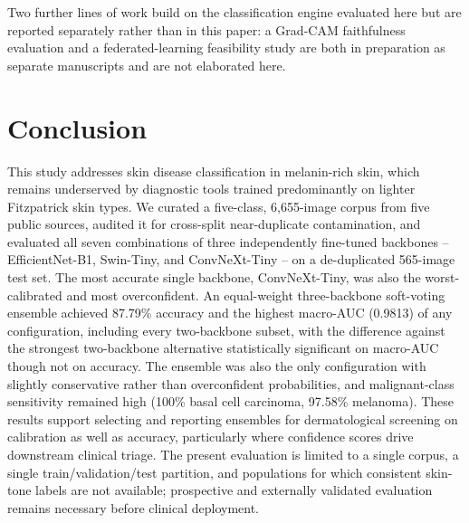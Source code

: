 \documentclass[VANCOUVER,twocolumn]{USG}
\begin{document}
Two further lines of work build on the classification engine evaluated
here but are reported separately rather than in this paper: a Grad-CAM
faithfulness evaluation and a federated-learning feasibility study are
both in preparation as separate manuscripts and are not elaborated here.

\section{Conclusion}\label{sec:conclusion}

This study addresses skin disease classification in melanin-rich skin,
which remains underserved by diagnostic tools trained predominantly on
lighter Fitzpatrick skin types. We curated a five-class, 6,655-image
corpus from five public sources, audited it for cross-split near-duplicate
contamination, and evaluated all seven combinations of three independently
fine-tuned backbones -- EfficientNet-B1, Swin-Tiny, and ConvNeXt-Tiny -- on
a de-duplicated 565-image test set. The most accurate single backbone,
ConvNeXt-Tiny, was also the worst-calibrated and most overconfident. An
equal-weight three-backbone soft-voting ensemble achieved 87.79\% accuracy
and the highest macro-AUC (0.9813) of any configuration, including every
two-backbone subset, with the difference against the strongest
two-backbone alternative statistically significant on macro-AUC though not
on accuracy. The ensemble was also the only configuration with slightly
conservative rather than overconfident probabilities, and malignant-class
sensitivity remained high (100\% basal cell carcinoma, 97.58\% melanoma).
These results support selecting and reporting ensembles for dermatological
screening on calibration as well as accuracy, particularly where
confidence scores drive downstream clinical triage. The present evaluation
is limited to a single corpus, a single train/validation/test partition,
and populations for which consistent skin-tone labels are not available;
prospective and externally validated evaluation remains necessary before
clinical deployment.

\end{document}

